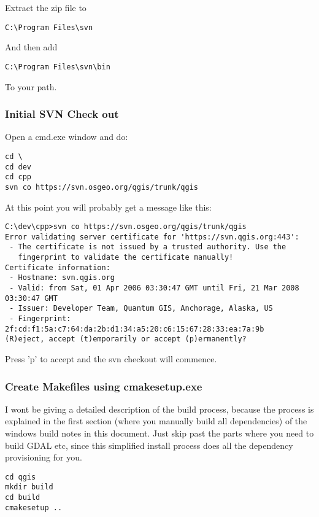 Extract the zip file to

\begin{verbatim}
C:\Program Files\svn
\end{verbatim}

And then add

\begin{verbatim}
C:\Program Files\svn\bin
\end{verbatim}

To your path.

\subsubsection{Initial SVN Check out}
Open a cmd.exe window and do:

\begin{verbatim}
cd \
cd dev
cd cpp
svn co https://svn.osgeo.org/qgis/trunk/qgis 
\end{verbatim}

At this point you will probably get a message like this:

\begin{verbatim}
C:\dev\cpp>svn co https://svn.osgeo.org/qgis/trunk/qgis
Error validating server certificate for 'https://svn.qgis.org:443':
 - The certificate is not issued by a trusted authority. Use the
   fingerprint to validate the certificate manually!
Certificate information:
 - Hostname: svn.qgis.org
 - Valid: from Sat, 01 Apr 2006 03:30:47 GMT until Fri, 21 Mar 2008 03:30:47 GMT
 - Issuer: Developer Team, Quantum GIS, Anchorage, Alaska, US
 - Fingerprint: 2f:cd:f1:5a:c7:64:da:2b:d1:34:a5:20:c6:15:67:28:33:ea:7a:9b
(R)eject, accept (t)emporarily or accept (p)ermanently?
\end{verbatim}

Press 'p' to accept and the svn checkout will commence.

\subsubsection{Create Makefiles using cmakesetup.exe}
I wont be giving a detailed description of the build process, because 
the process is explained in the first section (where you manually build 
all dependencies) of the windows build notes in this document. Just skip 
past the parts where you need to build GDAL etc, since this simplified 
install process does all the dependency provisioning for you.

\begin{verbatim}
cd qgis
mkdir build
cd build
cmakesetup ..
\end{verbatim}

